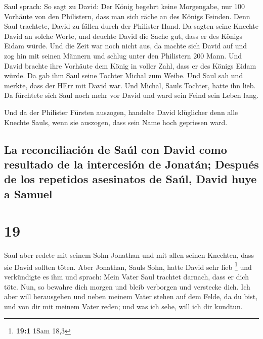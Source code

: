  Saul sprach: So sagt zu David: Der König begehrt keine
Morgengabe, nur 100 Vorhäute von den Philistern, dass man sich räche an
des Königs Feinden. Denn Saul trachtete, David zu fällen durch der
Philister Hand.  Da sagten seine Knechte David an solche
Worte, und deuchte David die Sache gut, dass er des Königs Eidam würde.
Und die Zeit war noch nicht aus,  da machte sich David
auf und zog hin mit seinen Männern und schlug unter den Philistern 200
Mann. Und David brachte ihre Vorhäute dem König in voller Zahl, dass er
des Königs Eidam würde. Da gab ihm Saul seine Tochter Michal zum Weibe.
 Und Saul sah und merkte, dass der HErr mit David war.
Und Michal, Sauls Tochter, hatte ihn lieb.  Da fürchtete
sich Saul noch mehr vor David und ward sein Feind sein Leben lang.

 Und da der Philister Fürsten auszogen, handelte David
klüglicher denn alle Knechte Sauls, wenn sie auszogen, dass sein Name
hoch gepriesen ward.

\hypertarget{la-reconciliaciuxf3n-de-sauxfal-con-david-como-resultado-de-la-intercesiuxf3n-de-jonatuxe1n-despuuxe9s-de-los-repetidos-asesinatos-de-sauxfal-david-huye-a-samuel}{%
\subsection{La reconciliación de Saúl con David como resultado de la
intercesión de Jonatán; Después de los repetidos asesinatos de Saúl,
David huye a
Samuel}\label{la-reconciliaciuxf3n-de-sauxfal-con-david-como-resultado-de-la-intercesiuxf3n-de-jonatuxe1n-despuuxe9s-de-los-repetidos-asesinatos-de-sauxfal-david-huye-a-samuel}}

\hypertarget{section-18}{%
\section{19}\label{section-18}}

 Saul aber redete mit seinem Sohn Jonathan und mit allen
seinen Knechten, dass sie David sollten töten. Aber Jonathan, Sauls
Sohn, hatte David sehr lieb \footnote{\textbf{19:1} 1Sam 18,3}
 und verkündigte es ihm und sprach: Mein Vater Saul
trachtet darnach, dass er dich töte. Nun, so bewahre dich morgen und
bleib verborgen und verstecke dich.  Ich aber will
herausgehen und neben meinem Vater stehen auf dem Felde, da du bist, und
von dir mit meinem Vater reden; und was ich sehe, will ich dir kundtun.

